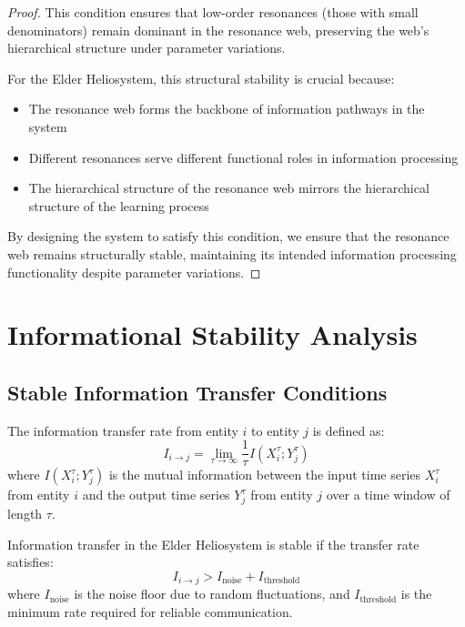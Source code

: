 \begin{proof}
This condition ensures that low-order resonances (those with small denominators) remain dominant in the resonance web, preserving the web's hierarchical structure under parameter variations.

For the Elder Heliosystem, this structural stability is crucial because:
\begin{itemize}
    \item The resonance web forms the backbone of information pathways in the system
    \item Different resonances serve different functional roles in information processing
    \item The hierarchical structure of the resonance web mirrors the hierarchical structure of the learning process
\end{itemize}

By designing the system to satisfy this condition, we ensure that the resonance web remains structurally stable, maintaining its intended information processing functionality despite parameter variations.
\end{proof}

\section{Informational Stability Analysis}

\subsection{Stable Information Transfer Conditions}

\begin{definition}
The information transfer rate from entity $i$ to entity $j$ is defined as:
\begin{equation}
I_{i \to j} = \lim_{\tau \to \infty} \frac{1}{\tau} I(X_i^{\tau}; Y_j^{\tau})
\end{equation}
where $I(X_i^{\tau}; Y_j^{\tau})$ is the mutual information between the input time series $X_i^{\tau}$ from entity $i$ and the output time series $Y_j^{\tau}$ from entity $j$ over a time window of length $\tau$.
\end{definition}

\begin{theorem}
Information transfer in the Elder Heliosystem is stable if the transfer rate satisfies:
\begin{equation}
I_{i \to j} > I_{\text{noise}} + I_{\text{threshold}}
\end{equation}
where $I_{\text{noise}}$ is the noise floor due to random fluctuations, and $I_{\text{threshold}}$ is the minimum rate required for reliable communication.
\end{theorem}

